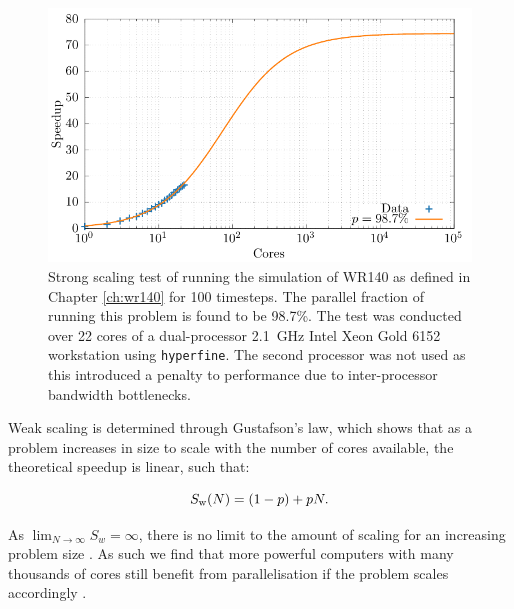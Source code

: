 \begin{figure}
  \centering
  \includegraphics{assets/athena-amdahl/amdahl.pdf}
  \caption[Strong scaling test of \athena]{Strong scaling test of \athena{} running the simulation of WR140 as defined in Chapter \ref{ch:wr140} for 100 timesteps. The parallel fraction of \athena{} running this problem is found to be 98.7\%. The test was conducted over 22 cores of a dual-processor \SI{2.1}{\giga\hertz} Intel Xeon Gold 6152 workstation using \texttt{hyperfine}. The second processor was not used as this introduced a penalty to performance due to inter-processor bandwidth bottlenecks.}
  \label{fig:amdahl-athena}
\end{figure}

Weak scaling is determined through Gustafson's law, which shows that as a problem increases in size to scale with the number of cores available, the theoretical speedup is linear, such that:

\begin{equation}
  S_\text{w}(N) = (1-p) + pN.
\end{equation}

\noindent
As $\lim_{N\rightarrow\infty} S_w = \infty$, there is no limit to the amount of scaling for an increasing problem size \parencite{gustafsonReevaluatingAmdahlLaw1988}.
As such we find that more powerful computers with many thousands of cores still benefit from parallelisation if the problem scales accordingly \parencite[Ch.~2]{pachecoIntroductionParallelProgramming2022}.

